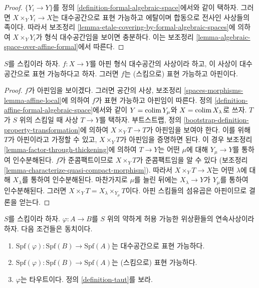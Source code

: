 \begin{proof}
$\{Y_i \to Y\}$를 정의 \ref{definition-formal-algebraic-space}에서와
같이 택하자. 그러면 $X \times_Y Y_i \to X$는 대수공간으로 표현
가능하고 에탈이며 합동으로 전사인 사상들의 족이다. 따라서 보조정리
\ref{lemma-etale-covering-by-formal-algebraic-spaces}에 의하여
$X \times_Y Y_i$가 형식 대수공간임을 보이면 충분하다.
이는 보조정리 \ref{lemma-algebraic-space-over-affine-formal}에서 따른다.
\end{proof}

\begin{lemma}
\label{lemma-affine-representable-by-algebraic-spaces}
$S$를 스킴이라 하자. $f : X \to Y$를 아핀 형식 대수공간의
사상이라 하고, 이 사상이 대수공간으로 표현 가능하다고 하자.
그러면 $f$는 (스킴으로) 표현 가능하고 아핀이다.
\end{lemma}

\begin{proof}
$f$가 아핀임을 보이겠다. 그러면 공간의 사상, 보조정리
\ref{spaces-morphisms-lemma-affine-local}에 의하여 $f$가 표현 가능하고
아핀임이 따른다. 정의 \ref{definition-affine-formal-algebraic-space}에서와
같이 $Y = \mathop{\mathrm{colim}}\nolimits Y_\mu$와 $X = \mathop{\mathrm{colim}}\nolimits X_\lambda$로 쓰자.
$T$가 $S$ 위의 스킴일 때 사상 $T \to Y$를 택하자. 부트스트랩,
정의 \ref{bootstrap-definition-property-transformation}에 의하여
$X \times_Y T \to T$가 아핀임을 보여야 한다. 이를 위해 $T$가
아핀이라고 가정할 수 있고, $X \times_Y T$가 아핀임을 증명하면 된다.
이 경우 보조정리 \ref{lemma-factor-through-thickening}에 의하여
$T \to Y$는 어떤 $\mu$에 대해 $Y_\mu \to Y$를 통하여 인수분해된다.
$f$가 준콤팩트이므로 $X \times_Y T$가 준콤팩트임을 알 수 있다
(보조정리 \ref{lemma-characterize-quasi-compact-morphism}). 따라서
$X \times_Y T \to X$는 어떤 $\lambda$에 대해 $X_\lambda$를 통하여
인수분해된다. 마찬가지로 $\mu$를 늘린 뒤에는
$X_\lambda \to Y$가 $Y_\mu$를 통하여 인수분해된다. 그러면
$X \times_Y T = X_\lambda \times_{Y_\mu} T$이다.
아핀 스킴들의 섬유곱은 아핀이므로 결론을 얻는다.
\end{proof}

\begin{lemma}
\label{lemma-representable-affine}
$S$를 스킴이라 하자. $\varphi : A \to B$를 $S$ 위의 약하게 허용
가능한 위상환들의 연속사상이라 하자. 다음 조건들은 동치이다.
\begin{enumerate}
\item $\text{Spf}(\varphi) : \text{Spf}(B) \to \text{Spf}(A)$는
대수공간으로 표현 가능하다.
\item $\text{Spf}(\varphi) : \text{Spf}(B) \to \text{Spf}(A)$는
(스킴으로) 표현 가능하다.
\item $\varphi$는 타우트이다. 정의 \ref{definition-taut}를 보라.
\end{enumerate}
\end{lemma}

